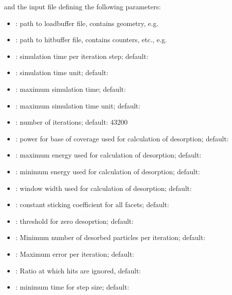 and the input file defining the following parameters:
\begin{itemize}[noitemsep,topsep=0pt]
\item {}: path to loadbuffer file, contains geometry, e.g.\ 
\item {}: path to hitbuffer file, contains counters, etc., e.g.\ 
\item {}: simulation time per iteration step; default: 
\item {}: simulation time unit; default: 
\item {}: maximum simulation time; default: 
\item {}: maximum simulation time unit; default: 
\item {}: number of iterations; default: 43200
\item{}: power for base of coverage used for calculation of desorption; default:
\item {}: maximum energy used for calculation of desorption; default:
\item {}: minimum energy used for calculation of desorption; default:
\item {}: window width used for calculation of desorption; default:
\item {}: constant sticking coefficient for all facets; default:
\item {}: threshold for zero desoprtion; default:
\item {}: Minimum number of desorbed particles per iteration; default: 
\item {}: Maximum error per iteration; default: 
\item {}: Ratio at which hits are ignored, default: 
\item {}: minimum time for step size; default:
\end{itemize}
